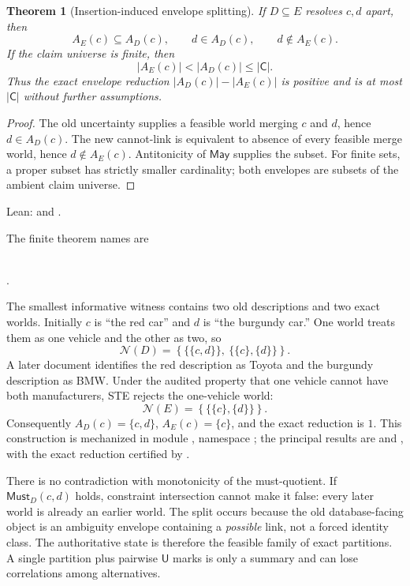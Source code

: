 \documentclass[11pt]{article}
\newtheorem{theorem}{Theorem}[section]
\theoremstyle{definition}
\theoremstyle{remark}
\newcommand{\Feas}{\mathcal N}
\newcommand{\Claims}{\mathsf C}
\newcommand{\Must}{\mathsf{Must}}
\newcommand{\May}{\mathsf{May}}
\newcommand{\Uncertain}{\mathsf U}
\begin{document}
\begin{theorem}[Insertion-induced envelope splitting]
If $D\subseteq E$ resolves $c,d$ apart, then
\[
  A_E(c)\subseteq A_D(c),\qquad
  d\in A_D(c),\qquad d\notin A_E(c).
\]
If the claim universe is finite, then
\[
  |A_E(c)|<|A_D(c)|\leq |\Claims|.
\]
Thus the exact envelope reduction
$|A_D(c)|-|A_E(c)|$ is positive and is at most $|\Claims|$ without further
assumptions.
\end{theorem}
\begin{proof}
The old uncertainty supplies a feasible world merging $c$ and $d$, hence
$d\in A_D(c)$.  The new cannot-link is equivalent to absence of every
feasible merge world, hence $d\notin A_E(c)$.  Antitonicity of $\May$ supplies
the subset.  For finite sets, a proper subset has strictly smaller
cardinality; both envelopes are subsets of the ambient claim universe.
\end{proof}
\noindent Lean:  and
.

\noindent The finite theorem names are
\begin{center}
\small
{}\\
.
\end{center}

The smallest informative witness contains two old descriptions and two exact
worlds.  Initially $c$ is ``the red car'' and $d$ is ``the burgundy car.''
One world treats them as one vehicle and the other as two, so
\[
  \Feas(D)=\left\{\{\{c,d\}\},\ \{\{c\},\{d\}\}\right\}.
\]
A later document identifies the red description as Toyota and the burgundy
description as BMW.  Under the audited property that one vehicle cannot have
both manufacturers, STE rejects the one-vehicle world:
\[
  \Feas(E)=\left\{\{\{c\},\{d\}\}\right\}.
\]
Consequently $A_D(c)=\{c,d\}$, $A_E(c)=\{c\}$, and the exact reduction is
$1$.  This construction is mechanized in module
, namespace ;
the principal results are
 and
, with the exact reduction
certified by .

There is no contradiction with monotonicity of the must-quotient.  If
$\Must_D(c,d)$ holds, constraint intersection cannot make it false:
every later world is already an earlier world.  The split occurs because the
old database-facing object is an ambiguity envelope containing a
\emph{possible} link, not a forced identity class.  The authoritative state is
therefore the feasible family of exact partitions.  A single partition plus
pairwise $\Uncertain$ marks is only a summary and can lose correlations among
alternatives.
\end{document}
